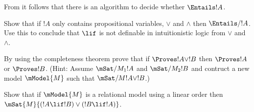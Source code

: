 \documentclass[../../../include/open-logic-section]{subfiles}
\begin{document}
From  it follows that there is an algorithm to decide whether $\Entails !A$.


\begin{prob}
Show that if $!A$ only contains propositional variables, $\lor$ and $\land$ then $\Entails/ !A$. Use this to conclude that $\lif$ is not definable in intuitionistic logic from $\lor$ and $\land$. 
\end{prob}


\begin{prob}
By using the completeness theorem prove that if $\Proves !A \lor !B$ then $\Proves !A$ or $\Proves !B$. (Hint: Assume $\mSat/{M_1}{!A}$ and $\mSat/{M_2}{!B}$ and contruct a new model $\mModel{M}$ such that $\mSat/{M}{!A \lor !B}$.)
\end{prob}

\begin{prob} 
Show that if $\mModel{M}$ is a relational model using a linear order then $\mSat{M}{(!A \lif !B)\lor(!B \lif !A)}$.
\end{prob}
\end{document}
